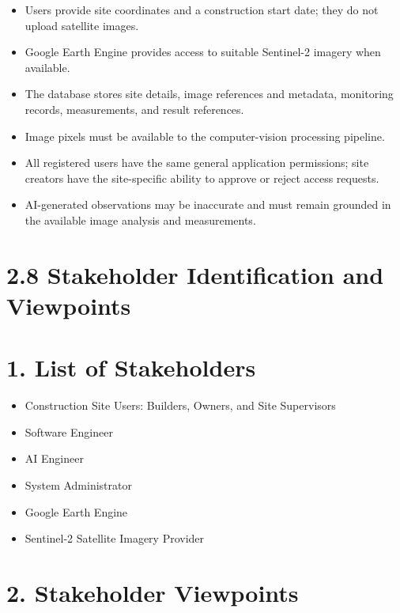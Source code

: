 \documentclass[12pt,a4paper]{report}
\begin{document}
\begin{itemize}
\item
  Users provide site coordinates and a construction start date; they do
  not upload satellite images.
\item
  Google Earth Engine provides access to suitable Sentinel-2 imagery
  when available.
\item
  The database stores site details, image references and metadata,
  monitoring records, measurements, and result references.
\item
  Image pixels must be available to the computer-vision processing
  pipeline.
\item
  All registered users have the same general application permissions;
  site creators have the site-specific ability to approve or reject
  access requests.
\item
  AI-generated observations may be inaccurate and must remain grounded
  in the available image analysis and measurements.
\end{itemize}

\section{2.8 Stakeholder Identification and
Viewpoints}\label{stakeholder-identification-and-viewpoints}

\section{1. List of Stakeholders}\label{list-of-stakeholders}

\begin{itemize}
\item
  Construction Site Users: Builders, Owners, and Site Supervisors
\item
  Software Engineer
\item
  AI Engineer
\item
  System Administrator
\item
  Google Earth Engine
\item
  Sentinel-2 Satellite Imagery Provider
\end{itemize}

\section{2. Stakeholder Viewpoints}\label{stakeholder-viewpoints}
\end{document}
